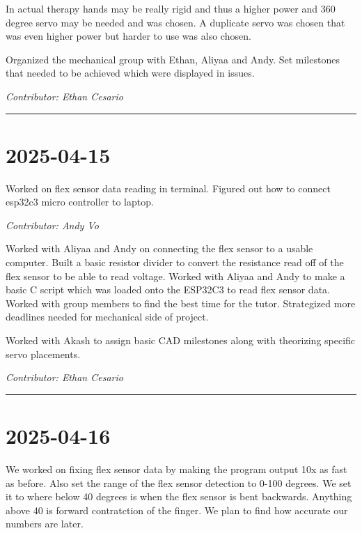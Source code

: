 \documentclass[12pt]{article}
\begin{document}
In actual therapy hands may be really rigid and thus a higher power and 360 degree servo may be needed and was chosen. A duplicate servo was chosen that was even higher power but harder to use was also chosen.

Organized the mechanical group with Ethan, Aliyaa and Andy. Set milestones that needed to be achieved which were displayed in issues. 

\vspace{1em}
\noindent\textit{Contributor: Ethan Cesario}
\vspace{1em}
\hrule


\section*{2025-04-15}
Worked on flex sensor data reading in terminal. Figured out how to connect esp32c3 micro controller to laptop.


\vspace{1em}
\noindent\textit{Contributor: Andy Vo}
\vspace{1em}

Worked with Aliyaa and Andy on connecting the flex sensor to a usable computer. Built a basic resistor divider to convert the resistance read off of the flex sensor to be able to read voltage. Worked with Aliyaa and Andy to make a basic C script which was loaded onto the ESP32C3 to read flex sensor data. Worked with group members to find the best time for the tutor. Strategized more deadlines needed for mechanical side of project.

Worked with Akash to assign basic CAD milestones along with theorizing specific servo placements.

\vspace{1em}
\noindent\textit{Contributor: Ethan Cesario}
\vspace{1em}

\hrule

\section*{2025-04-16}
We worked on fixing flex sensor data by making the program output 10x as fast as before. Also set the range of the flex sensor detection to 0-100 degrees. We set it to where below 40 degrees is when the flex sensor is bent backwards. Anything above 40 is forward contratction of the finger. We plan to find how accurate our numbers are later.
\end{document}
